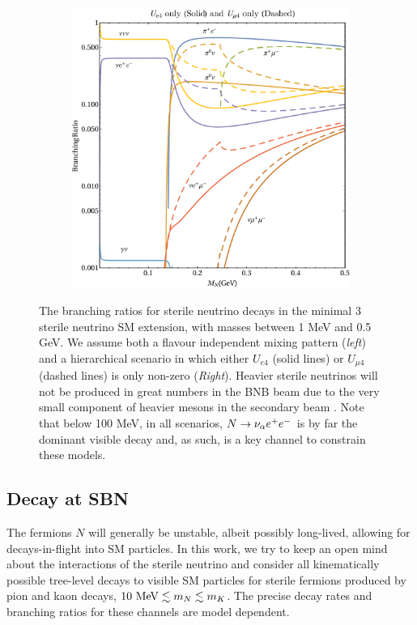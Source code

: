 \documentclass[11pt, a4paper]{article}
\def\ster{\ensuremath N}
\begin{document}
\begin{figure}[t]
\begin{subfigure}{.5\textwidth}
\includegraphics[width=\linewidth]{figures/BR_notlog_square2.pdf}
\end{subfigure}

\caption{\label{fig:branchingratios}The branching ratios for sterile neutrino
decays in the minimal 3 sterile neutrino SM extension, with masses between 1
MeV and 0.5 GeV. We assume both a flavour independent mixing pattern (\emph{left}) 
and a hierarchical scenario in which either $U_{e4}$ (solid lines) or $U_{\mu 4}$
(dashed lines) is only non-zero (\emph{Right}). Heavier sterile neutrinos will
not be produced in great numbers in the BNB beam due to the very small
component of heavier mesons in the secondary beam \cite{AguilarArevalo:2008yp}.
Note that below 100 MeV, in all scenarios, $\ster \rightarrow \nu_\alpha e^+
e^-$ is by far the dominant visible decay and, as such, is a key channel to 
constrain these models.}

\end{figure}
%

\subsection{Decay at SBN}

The fermions $N$ will generally be unstable, albeit possibly long-lived, allowing
for decays-in-flight into SM particles. In this work, we try to keep an open
mind about the interactions of the sterile neutrino and consider all
kinematically possible tree-level decays to visible SM particles for sterile
fermions produced by pion and kaon decays, $10~\text{MeV}\lesssim m_{\ster}
\lesssim m_K$. The precise decay rates and branching ratios for these channels
are model dependent. 
%
\end{document}
